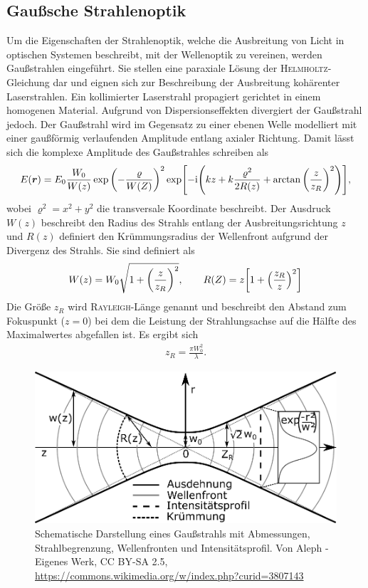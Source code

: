 \documentclass[a4paper,twoside,final]{article}
\begin{document}
\subsection{Gaußsche Strahlenoptik}
Um die Eigenschaften der Strahlenoptik, welche die Ausbreitung von Licht in optischen Systemen beschreibt, mit der Wellenoptik zu vereinen, werden Gaußstrahlen eingeführt. Sie stellen eine paraxiale Lösung der \textsc{Helmholtz}-Gleichung dar und eignen sich zur Beschreibung der Ausbreitung kohärenter Laserstrahlen. Ein kollimierter Laserstrahl propagiert gerichtet in einem homogenen Material. Aufgrund von Dispersionseffekten divergiert der Gaußstrahl jedoch. Der Gaußstrahl wird im Gegensatz zu einer ebenen Welle modelliert mit einer gaußförmig verlaufenden Amplitude entlang axialer Richtung. Damit lässt sich die komplexe Amplitude des Gaußstrahles schreiben als~\cite{Saleh}
\begin{align}
  E(\bm{r}) = E_0 \frac{W_0}{W(z)} \exp\qty(-\frac{\varrho}{W(Z)})^2 \exp[-\mathrm{i}\qty(kz + k \frac{\varrho^2}{2R(z)}+ \arctan\qty(\frac{z}{z_R})^2)],
\end{align}
wobei $\varrho^2 = x^2 + y^2$ die transversale Koordinate beschreibt. Der Ausdruck $W(z)$ beschreibt den Radius des Strahls entlang der Ausbreitungsrichtung $z$ und $R(z)$ definiert den Krümmungsradius der Wellenfront aufgrund der Divergenz des Strahls. Sie sind definiert als
\begin{align}\label{eqn:Strahlradius_Krümmung}
  W(z) = W_0 \sqrt{1+\qty(\frac{z}{z_R})^2}, \qquad R(Z) = z \qty[1+\qty(\frac{z_R}{z})^2]
\end{align}
Die Größe $z_R$ wird \textsc{Rayleigh}-Länge genannt und beschreibt den Abstand zum Fokuspunkt ($z=0$) bei dem die Leistung der Strahlungsachse auf die Hälfte des Maximalwertes abgefallen ist. Es ergibt sich
\begin{align}\label{eqn:z_r}
  z_R = \frac{\pi W_0^2}{\lambda}.
\end{align}

\begin{figure}[htp]
  \centering
  \includegraphics[width=.7\textwidth]{Bilder/Gauss_Strahl.pdf}
  \caption{Schematische Darstellung eines Gaußstrahls mit Abmessungen, Strahlbegrenzung, Wellenfronten und Intensitätsprofil. Von Aleph - Eigenes Werk, CC BY-SA 2.5, \url{https://commons.wikimedia.org/w/index.php?curid=3807143}}
  \label{fig:Gauss_Strahl}
\end{figure}
\end{document}
